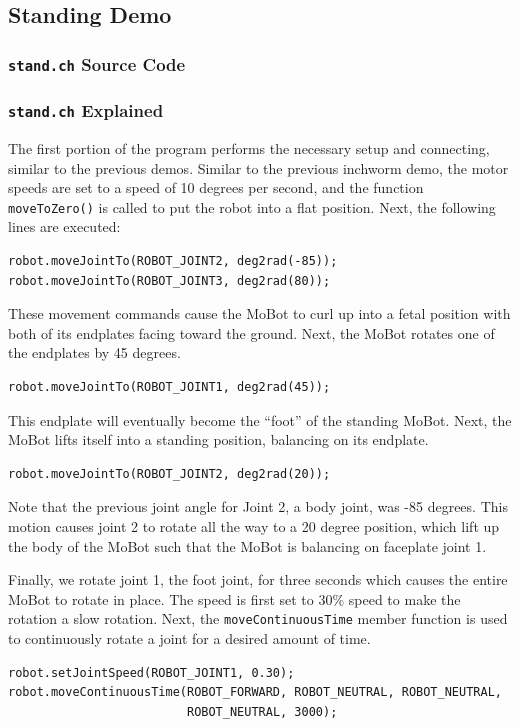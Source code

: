 \documentclass{article}
\begin{document}
\subsection{Standing Demo}
\subsubsection{\texttt{stand.ch} Source Code}

\subsubsection{\texttt{stand.ch} Explained}
The first portion of the program performs the necessary setup and connecting,
similar to the previous demos. Similar to the previous inchworm demo, the
motor speeds are set to a speed of 10 degrees per second, and the function \texttt{moveToZero()} is
called to put the robot into a flat position. Next, the following lines
are executed:
\begin{verbatim}
robot.moveJointTo(ROBOT_JOINT2, deg2rad(-85));
robot.moveJointTo(ROBOT_JOINT3, deg2rad(80));
\end{verbatim}
These movement commands cause the MoBot to curl up into a fetal position with
both of its endplates facing toward the ground. Next, the MoBot rotates one 
of the endplates by 45 degrees. 
\begin{verbatim}
robot.moveJointTo(ROBOT_JOINT1, deg2rad(45));
\end{verbatim}
This endplate will eventually become the ``foot'' of the standing MoBot. Next,
the MoBot lifts itself into a standing position, balancing on its endplate.
\begin{verbatim}
robot.moveJointTo(ROBOT_JOINT2, deg2rad(20));
\end{verbatim}
Note that the previous joint angle for Joint 2, a body joint, was -85 degrees. 
This motion causes joint 2 to rotate all the way to a 20 degree position, which
lift up the body of the MoBot such that the MoBot is balancing on faceplate joint 1.

Finally, we rotate joint 1, the foot joint, for three seconds which causes the
entire MoBot to rotate in place. The speed is first set to 30\% speed to make the
rotation a slow rotation. Next, the \texttt{moveContinuousTime} member function
is used to continuously rotate a joint for a desired amount of time.
\begin{verbatim}
robot.setJointSpeed(ROBOT_JOINT1, 0.30);
robot.moveContinuousTime(ROBOT_FORWARD, ROBOT_NEUTRAL, ROBOT_NEUTRAL, 
                         ROBOT_NEUTRAL, 3000);
\end{verbatim}
\end{document}
